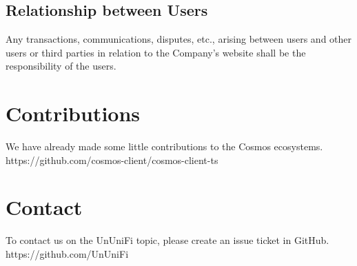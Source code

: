 \documentclass[dvipdfmx]{jsarticle}
\begin{document}
\subsection{Relationship between Users}
Any transactions, communications, disputes, etc., arising between users and other users or third parties in relation to the Company's website shall be the responsibility of the users. 

\section{Contributions}
We have already made some little contributions to the Cosmos ecosystems. \\
https://github.com/cosmos-client/cosmos-client-ts 

\section{Contact}
To contact us on the UnUniFi topic, please create an issue ticket in GitHub. \\
https://github.com/UnUniFi
\end{document}
